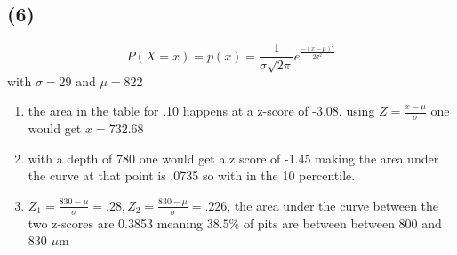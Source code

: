 \documentclass[12pt]{report}
\begin{document}
      \subsection*{{\bf (6)}}
            $$P(X=x)=p(x)=\frac{1}{\sigma\sqrt{2\pi}}e^{\frac{-(x-\mu)^2}{2\sigma^2}}$$
      with $\sigma=29$ and $\mu=822$
            \begin{enumerate}[label={\bf \alph*}]
      \item the area in the table for .10  happens at a z-score of -3.08. using $Z= \frac{x-\mu}{\sigma}$ one would get $x=732.68$
      \item with a depth of 780 one would get a z score of -1.45 making the area under the curve at that point is .0735 so with in the 10 percentile. 
      \item $Z_1 = \frac{830-\mu}{\sigma}=.28, Z_2 = \frac{830-\mu}{\sigma} =.226$, the area under the curve between the two z-scores are 0.3853 meaning $38.5\%$ of pits are between  between 800 and 830 $\mu$m
      
      \end{enumerate}  
\end{document}
